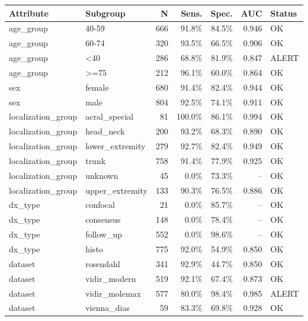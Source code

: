 \begin{tabular}{llrrrrl}
\toprule
\textbf{Attribute} & \textbf{Subgroup} & \textbf{N} & \textbf{Sens.} & \textbf{Spec.} & \textbf{AUC} & \textbf{Status} \\
\midrule
age\_group & 40-59 & 666 & 91.8\% & 84.5\% & 0.946 & OK \\
age\_group & 60-74 & 320 & 93.5\% & 66.5\% & 0.906 & OK \\
age\_group & <40 & 286 & 68.8\% & 81.9\% & 0.847 & ALERT \\
age\_group & >=75 & 212 & 96.1\% & 60.0\% & 0.864 & OK \\
sex & female & 680 & 91.4\% & 82.4\% & 0.944 & OK \\
sex & male & 804 & 92.5\% & 74.1\% & 0.911 & OK \\
localization\_group & acral\_special & 81 & 100.0\% & 86.1\% & 0.994 & OK \\
localization\_group & head\_neck & 200 & 93.2\% & 68.3\% & 0.890 & OK \\
localization\_group & lower\_extremity & 279 & 92.7\% & 82.4\% & 0.949 & OK \\
localization\_group & trunk & 758 & 91.4\% & 77.9\% & 0.925 & OK \\
localization\_group & unknown & 45 & 0.0\% & 73.3\% & -- & OK \\
localization\_group & upper\_extremity & 133 & 90.3\% & 76.5\% & 0.886 & OK \\
dx\_type & confocal & 21 & 0.0\% & 85.7\% & -- & OK \\
dx\_type & consensus & 148 & 0.0\% & 78.4\% & -- & OK \\
dx\_type & follow\_up & 552 & 0.0\% & 98.6\% & -- & OK \\
dx\_type & histo & 775 & 92.0\% & 54.9\% & 0.850 & OK \\
dataset & rosendahl & 341 & 92.9\% & 44.7\% & 0.850 & OK \\
dataset & vidir\_modern & 519 & 92.1\% & 67.4\% & 0.873 & OK \\
dataset & vidir\_molemax & 577 & 80.0\% & 98.4\% & 0.985 & ALERT \\
dataset & vienna\_dias & 59 & 83.3\% & 69.8\% & 0.928 & OK \\
\bottomrule
\end{tabular}
